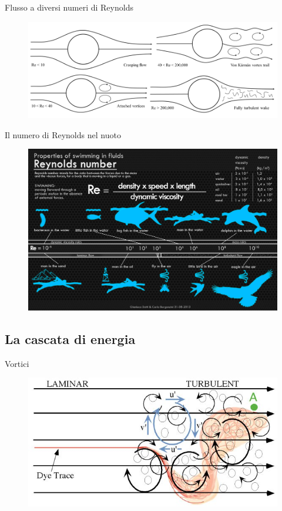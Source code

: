 \documentclass[11pt]{beamer}
\begin{document}
\begin{frame}{Flusso a diversi numeri di Reynolds}
\begin{figure}
\centering
\includegraphics[scale=0.4]{flow_cylinder_6.png}
\end{figure}
\end{frame}

\begin{frame}{Il numero di Reynolds nel nuoto}
\begin{figure}
\centering
\includegraphics[scale=0.12]{infographic.jpg}
\end{figure}
\end{frame}

\subsection{La cascata di energia}

\begin{frame}{Vortici}
\begin{figure}
\centering
\includegraphics[scale=0.4]{Airplane_Turbulence_MIT.jpg}
\end{figure}
\end{frame}
\end{document}
